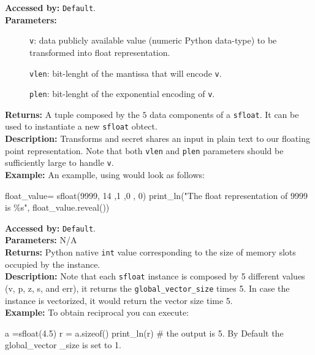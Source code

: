 		      \textbf{Accessed by:} \verb|Default|. \\
		      \textbf{Parameters:}
		      \begin{description}
			     \item[]\verb|v|: data publicly available value (numeric Python data-type) to be transformed into float representation.
			     \item[]\verb|vlen|: bit-lenght of the mantissa that will encode \verb|v|.
			     \item[]\verb|plen|: bit-lenght of the exponential encoding of \verb|v|.
		      \end{description}
		      \textbf{Returns:} A tuple composed by the $5$ data components of a \verb|sfloat|. 
		      It can be used to instantiate a new \verb|sfloat| obtect.\\
		      \textbf{Description:} Transforms and secret shares an input 
		      in plain text to our floating point representation. 
		      Note that both \verb|vlen| and \verb|plen| parameters should 
		      be sufficiently large to handle \verb|v|.\\
		\textbf{Example:}
		An examplle, using  would look as follows:
		\begin{mylisting}
		   float_value= sfloat(9999, 14 ,1 ,0 , 0) 
	 	   print_ln("The float representation of 9999 is \%s", float_value.reveal())		
		\end{mylisting}
                        \textbf{Accessed by:} \verb|Default|. \\
                        \textbf{Parameters:} N/A \\
                        \textbf{Returns:}
                                 Python native \verb|int| value corresponding to the size of 
                                 memory slots occupied by the instance. \\
                        \textbf{Description:}
                                Note that each \verb|sfloat| instance is composed by 5 
                                different values (v, p, z, s, and err), 
                                it returns the \verb|global_vector_size| times 5. 
                                In case the instance is vectorized, 
                                it would return the vector size time 5.\\
                \textbf{Example:}
                    To obtain reciprocal you can execute:
                        \begin{mylisting}
                                a =sfloat(4.5)
                                r = a.sizeof()
                                print_ln(r)  # the output is 5. By Default the global_vector
                                _size is set to 1.
                        \end{mylisting}
                        
